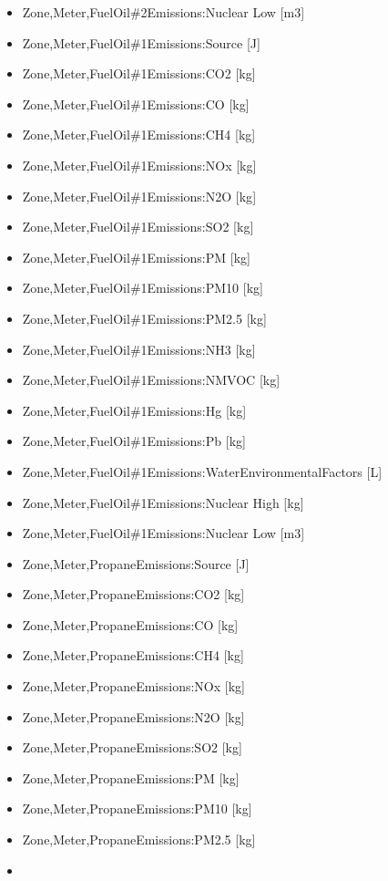 \begin{itemize}
\item
  Zone,Meter,FuelOil\#2Emissions:Nuclear Low {[}m3{]}
\item
  Zone,Meter,FuelOil\#1Emissions:Source {[}J{]}
\item
  Zone,Meter,FuelOil\#1Emissions:CO2 {[}kg{]}
\item
  Zone,Meter,FuelOil\#1Emissions:CO {[}kg{]}
\item
  Zone,Meter,FuelOil\#1Emissions:CH4 {[}kg{]}
\item
  Zone,Meter,FuelOil\#1Emissions:NOx {[}kg{]}
\item
  Zone,Meter,FuelOil\#1Emissions:N2O {[}kg{]}
\item
  Zone,Meter,FuelOil\#1Emissions:SO2 {[}kg{]}
\item
  Zone,Meter,FuelOil\#1Emissions:PM {[}kg{]}
\item
  Zone,Meter,FuelOil\#1Emissions:PM10 {[}kg{]}
\item
  Zone,Meter,FuelOil\#1Emissions:PM2.5 {[}kg{]}
\item
  Zone,Meter,FuelOil\#1Emissions:NH3 {[}kg{]}
\item
  Zone,Meter,FuelOil\#1Emissions:NMVOC {[}kg{]}
\item
  Zone,Meter,FuelOil\#1Emissions:Hg {[}kg{]}
\item
  Zone,Meter,FuelOil\#1Emissions:Pb {[}kg{]}
\item
  Zone,Meter,FuelOil\#1Emissions:WaterEnvironmentalFactors {[}L{]}
\item
  Zone,Meter,FuelOil\#1Emissions:Nuclear High {[}kg{]}
\item
  Zone,Meter,FuelOil\#1Emissions:Nuclear Low {[}m3{]}
\item
  Zone,Meter,PropaneEmissions:Source {[}J{]}
\item
  Zone,Meter,PropaneEmissions:CO2 {[}kg{]}
\item
  Zone,Meter,PropaneEmissions:CO {[}kg{]}
\item
  Zone,Meter,PropaneEmissions:CH4 {[}kg{]}
\item
  Zone,Meter,PropaneEmissions:NOx {[}kg{]}
\item
  Zone,Meter,PropaneEmissions:N2O {[}kg{]}
\item
  Zone,Meter,PropaneEmissions:SO2 {[}kg{]}
\item
  Zone,Meter,PropaneEmissions:PM {[}kg{]}
\item
  Zone,Meter,PropaneEmissions:PM10 {[}kg{]}
\item
  Zone,Meter,PropaneEmissions:PM2.5 {[}kg{]}
\item

\end{itemize}
